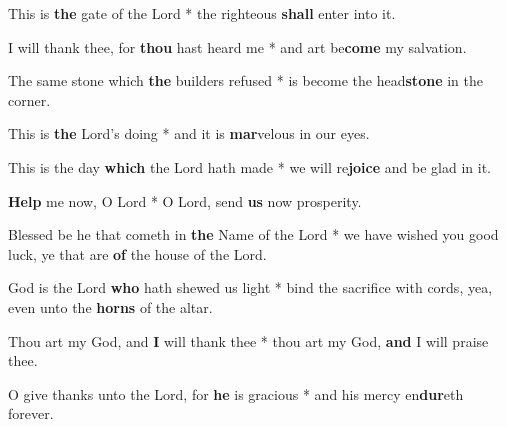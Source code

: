 \begin{multicols}{2}
	This is \textbf{the} gate of the Lord * the righteous \textbf{shall} enter into it.
	
	I will thank thee, for \textbf{thou} hast heard me * and art be\textbf{come} my salvation.
	
	The same stone which \textbf{the} builders refused * is become the head\textbf{stone} in the corner.
	
	This is \textbf{the} Lord's doing * and it is \textbf{mar}velous in our eyes.
	
	This is the day \textbf{which} the Lord hath made * we will re\textbf{joice} and be glad in it.
	
	\textbf{Help} me now, O Lord * O Lord, send \textbf{us} now prosperity.
	
	Blessed be he that cometh in \textbf{the} Name of the Lord * we have wished you good luck, ye that are \textbf{of} the house of the Lord.
	
	God is the Lord \textbf{who} hath shewed us light * bind the sacrifice with cords, yea, even unto the \textbf{horns} of the altar.
	
	Thou art my God, and \textbf{I} will thank thee * thou art my God, \textbf{and} I will praise thee.
	
	O give thanks unto the Lord, for \textbf{he} is gracious * and his mercy en\textbf{dur}eth forever.
\end{multicols}
